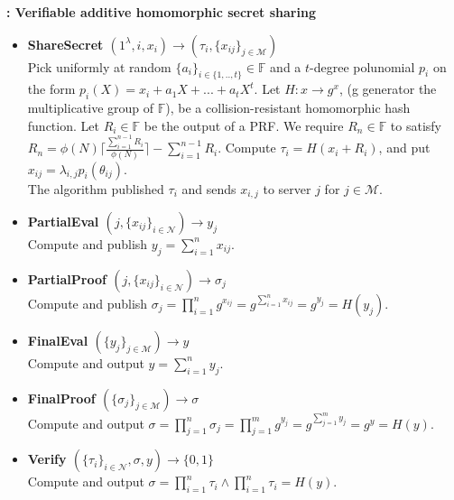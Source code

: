 \begin{algorithm}[H]
\caption{\textbf{: Verifiable additive homomorphic secret sharing}}
\begin{itemize}
  \item\textbf{ShareSecret $(1^\lambda,i,x_i)\xrightarrow[]{}(\tau_i,\{x_{ij}\}_{j\in\mathcal{M}})$}\\
Pick uniformly at random $\{a_i\}_{i\in\{1,..,t\}}\in\mathds{F}$ and a $t$-degree polunomial $p_i$ on the form $p_i(X) = x_i + a_1X+...+a_tX^t$. Let $H:x\to g^x$, (g generator the multiplicative group of $\mathds{F}$), be a collision-resistant homomorphic hash function. Let $R_i\in\mathds{F}$ be the output of a PRF. We require $R_n\in \mathds{F}$ to satisfy
$R_n = \phi(N)\lceil \frac{\sum_{i=1}^{n-1}R_i}{\phi(N)}\rceil- \sum_{i=1}^{n-1}R_i $. Compute $\tau_i = H(x_i+R_i)$, and put $x_{ij}=\lambda_{i,j}p_i(\theta_{ij})$. \\
The algorithm published $\tau_i$ and sends $x_{i,j}$ to server $j$ for $j\in\mathcal{M}$. 

\item\textbf{PartialEval $(j,\{x_{ij}\}_{i\in\mathcal{N}})\xrightarrow[]{}y_j$}\\
Compute and publish $y_j = \sum_{i=1}^n x_{ij}$.

\item\textbf{PartialProof $(j,\{x_{ij}\}_{i\in\mathcal{N}})\xrightarrow[]{}\sigma_j$}\\
Compute and publish $\sigma_j = \prod_{i=1}^n g^{x_{ij}} =  g^{\sum_{i=1}^n x_{ij}}= g^{y_j}=H(y_j)$.

\item\textbf{FinalEval $(\{y_j\}_{j\in\mathcal{M}})\xrightarrow[]{}y$}\\
Compute and output $y = \sum_{i=1}^n y_{j}$.

\item\textbf{FinalProof $(\{\sigma_j\}_{j\in\mathcal{M}})\xrightarrow[]{}\sigma$}\\
Compute and output $\sigma = \prod_{j=1}^n \sigma_j = \prod_{j=1}^m g^{y_{j}} =  g^{\sum_{j=1}^m y_{j}}= g^{y}=H(y)$.

\item\textbf{Verify $(\{\tau_i\}_{i\in\mathcal{N}},\sigma,y)\xrightarrow[]{}\{0,1\}$}\\
Compute and output $\sigma = \prod_{i=1}^n \tau_i \wedge \prod_{i=1}^n \tau_i = H(y)$.
\end{itemize}
\label{alg:VAHSS-HSS}
\end{algorithm}


